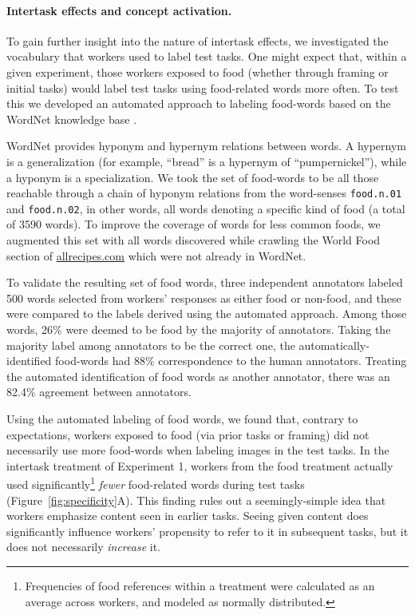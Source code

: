 \documentclass{sigchi}
\begin{document}
\paragraph{Intertask effects and concept activation.} 
To gain further insight into the nature of intertask effects, 
we investigated the vocabulary that workers used to label test tasks. 
One might expect that, within a given experiment, those workers exposed 
to food (whether through framing or initial
tasks) would label test tasks using 
food-related words more often.  To test this we developed an 
automated approach to labeling food-words based on the 
WordNet knowledge base \cite{felbaum1998wordnet}.  

WordNet provides
hyponym and hypernym relations between words.  A hypernym is a 
generalization (for example, ``bread'' is a hypernym of ``pumpernickel''), 
while a hyponym is a specialization.  We took the set of food-words
to be all those reachable through
a chain of hyponym relations from the word-senses 
\texttt{food.n.01} and \texttt{food.n.02}, in other words, all words
denoting a specific kind of food (a total of 3590 words).  
To improve the coverage of words for
less common foods, we augmented this set with all words
discovered while crawling the World Food section of \url{allrecipes.com} 
which were not already in WordNet.  

To validate the resulting set of 
food words, three independent annotators labeled 500 words selected from 
workers' responses as either food or non-food, and these were
compared to the labels derived using the automated approach.
Among those words, 26\% were 
deemed to be food by the majority of annotators.  
Taking the majority label among annotators to be the correct one, 
the automatically-identified food-words
had 88\% correspondence to the human annotators.  Treating the
automated identification of food words as another annotator, there 
was an 82.4\% agreement between annotators.

Using the automated labeling of food words, we found that, contrary to
expectations,
workers exposed to food (via prior tasks or framing) did not necessarily
use more food-words when labeling images in the test tasks.
In the intertask treatment of Experiment 1, workers from the food treatment
actually used significantly\footnote{
  Frequencies of food references within a treatment were calculated as
  an average across workers, and modeled as normally distributed.
} \textit{fewer} food-related words 
during test tasks (Figure~\ref{fig:specificity}A).  This finding
rules out a seemingly-simple idea that workers emphasize
content seen in earlier tasks.  Seeing given content does significantly 
influence workers' propensity to refer to it in subsequent tasks, but it 
does not necessarily \textit{increase} it.
\end{document}
